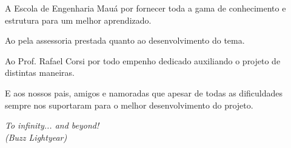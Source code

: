 \documentclass[
	12pt,				%
	openright,			%
	oneside,			%
	a4paper,			%
	english,			%
	french,				%
	spanish,			%
	brazil,				%
	oldfontcommands
	]{abntex2}
\begin{document}

\begin{agradecimentos}

A Escola de Engenharia Mauá por fornecer toda a gama de conhecimento e estrutura para um melhor aprendizado.

Ao {\imprimirorientador}  pela assessoria prestada quanto ao desenvolvimento do tema.

Ao Prof. Rafael Corsi por todo empenho dedicado auxiliando o projeto de distintas maneiras.

E aos nossos pais, amigos e namoradas que apesar de todas as dificuldades sempre nos suportaram para o melhor desenvolvimento do projeto.

\end{agradecimentos}

\begin{epigrafe}
    \vspace*{\fill}
	\begin{flushright}
		\textit{To infinity... and beyond!\\(Buzz Lightyear)}
	\end{flushright}
\end{epigrafe}

\end{document}
